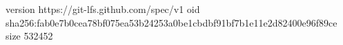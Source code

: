 version https://git-lfs.github.com/spec/v1
oid sha256:fab0e7b0cea78bf075ea53b24253a0be1cbdbf91bf7b1e11e2d82400e96f89ce
size 532452
